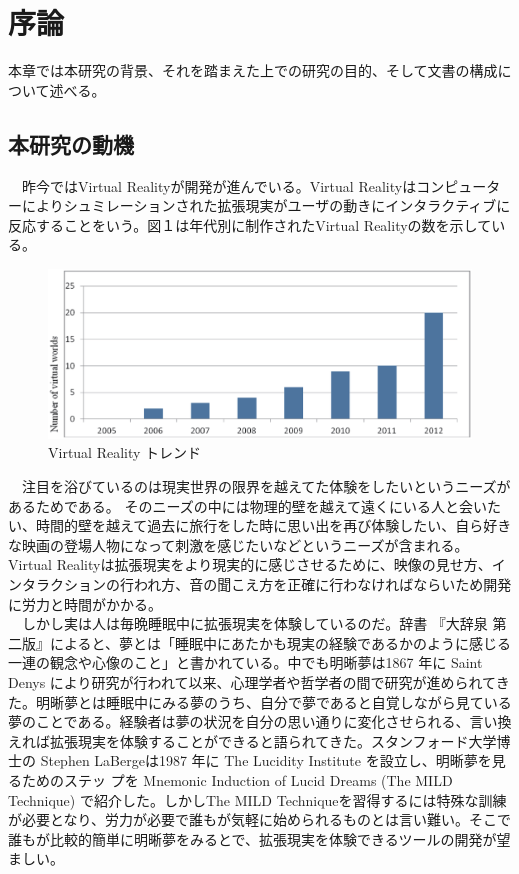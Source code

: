 \chapter{序論}
\label{chap:introduction}

本章では本研究の背景、それを踏まえた上での研究の目的、そして文書の構成について述べる。

\section{本研究の動機}
　昨今ではVirtual Realityが開発が進んでいる\cite{vrtrendShiny}。Virtual Realityはコンピューターによりシュミレーションされた拡張現実がユーザの動きにインタラクティブに反応することをいう。図１は年代別に制作されたVirtual Realityの数を示している\cite{vrtrendSamuel}。\\

\begin{figure}[htbp]
\begin{center}
\includegraphics[width=15cm]{eps/vrTrends.eps}
\caption{Virtual Reality トレンド}
\label{Virtual Reality トレンド}
\end{center}
\end{figure}

　注目を浴びているのは現実世界の限界を越えてた体験をしたいというニーズがあるためである。 そのニーズの中には物理的壁を越えて遠くにいる人と会いたい、時間的壁を越えて過去に旅行をした時に思い出を再び体験したい、自ら好きな映画の登場人物になって刺激を感じたいなどというニーズが含まれる。Virtual Realityは拡張現実をより現実的に感じさせるために、映像の見せ方、インタラクションの行われ方、音の聞こえ方を正確に行わなければならいため開発に労力と時間がかかる\cite{vrtrendShiny}。\\
　しかし実は人は毎晩睡眠中に拡張現実を体験しているのだ。辞書 『大辞泉 第二版』によると、夢とは「睡眠中にあたかも現実の経験であるかのように感じる一連の観念や心像のこと」\cite{dream}と書かれている。中でも明晰夢は1867 年に Saint Denys により研究が行われて以来\cite{saintDenys}、心理学者や哲学者の間で研究が進められてきた。明晰夢とは睡眠中にみる夢のうち、自分で夢であると自覚しながら見ている夢のことである。経験者は夢の状況を自分の思い通りに変化させられる、言い換えれば拡張現実を体験することができると語られてきた。スタンフォード大学博士の Stephen LaBergeは1987 年に The Lucidity Institute を設立し、明晰夢を見るためのステッ プを Mnemonic Induction of Lucid Dreams (The MILD Technique) で紹介した\cite{LaBerge}。しかしThe MILD Techniqueを習得するには特殊な訓練が必要となり、労力が必要で誰もが気軽に始められるものとは言い難い。そこで誰もが比較的簡単に明晰夢をみるとで、拡張現実を体験できるツールの開発が望ましい。

